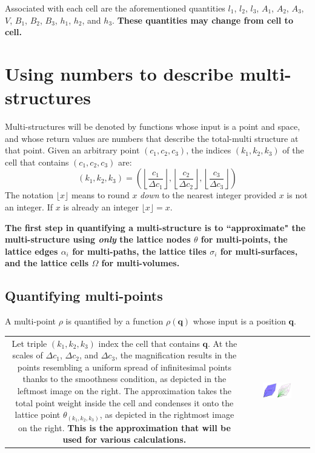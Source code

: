 \documentclass{book}
\begin{document}
Associated with each cell are the aforementioned quantities \(l_1\), \(l_2\), \(l_3\), \(A_1\), \(A_2\), \(A_3\), \(V\), \(B_1\), \(B_2\), \(B_3\), \(h_1\), \(h_2\), and \(h_3\). {\bf These quantities may change from cell to cell.}




\section{Using numbers to describe multi-structures}

Multi-structures will be denoted by functions whose input is a point and space, and whose return values are numbers that describe the total-multi structure at that point. Given an arbitrary point \((c_1, c_2, c_3)\), the indices \((k_1, k_2, k_3)\) of the cell that contains \((c_1, c_2, c_3)\) are:
\[(k_1, k_2, k_3) = \left(\left\lfloor\frac{c_1}{\Delta c_1}\right\rfloor, \left\lfloor\frac{c_2}{\Delta c_2}\right\rfloor, \left\lfloor\frac{c_3}{\Delta c_3}\right\rfloor\right)\] 
The notation \(\lfloor x \rfloor\) means to round \(x\) \emph{down} to the nearest integer provided \(x\) is not an integer. If \(x\) is already an integer \(\lfloor x \rfloor = x\). 

{\bf The first step in quantifying a multi-structure is to ``approximate" the multi-structure using \emph{only} the lattice nodes \(\theta\) for multi-points, the lattice edges \(\alpha_i\) for multi-paths, the lattice tiles \(\sigma_i\) for multi-surfaces, and the lattice cells \(\Omega\) for multi-volumes.} 


\subsection*{Quantifying multi-points}

A multi-point \(\rho\) is quantified by a function \(\rho(\mathbf{q})\) whose input is a position \(\mathbf{q}\). 

\begin{tabular}{cc}
\parbox{0.5\textwidth}{
Let triple \((k_1, k_2, k_3)\) index the cell that contains \(\mathbf{q}\). At the scales of \(\Delta c_1\), \(\Delta c_2\), and \(\Delta c_3\), the magnification results in the points resembling a uniform spread of infinitesimal points thanks to the smoothness condition, as depicted in the leftmost image on the right. The approximation takes the total point weight inside the cell and condenses it onto the lattice point \(\theta_{(k_1,k_2,k_3)}\), as depicted in the rightmost image on the right. {\bf This is the approximation that will be used for various calculations.}
} & \parbox{0.5\textwidth}{
\includegraphics[width = 0.5\textwidth]{Coordinate_systems/point_density}
}
\end{tabular}
\end{document}
